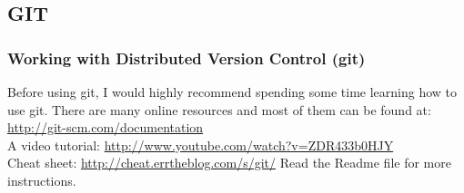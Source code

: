 

\subsection{GIT} %
\label{sub:git}
\begin{frame}
	\frametitle{Working with Distributed Version Control (git)}
	
	Before using git, I would highly recommend spending some time 
	learning how to use git.  There are many online resources and
	most of them can be found at: \url{http://git-scm.com/documentation} \\
	\vfill
	A video tutorial: \url{http://www.youtube.com/watch?v=ZDR433b0HJY} \\
	\vfill
	Cheat sheet: \url{http://cheat.errtheblog.com/s/git/}
	\vfill
	Read the Readme file for more instructions.
\end{frame}

